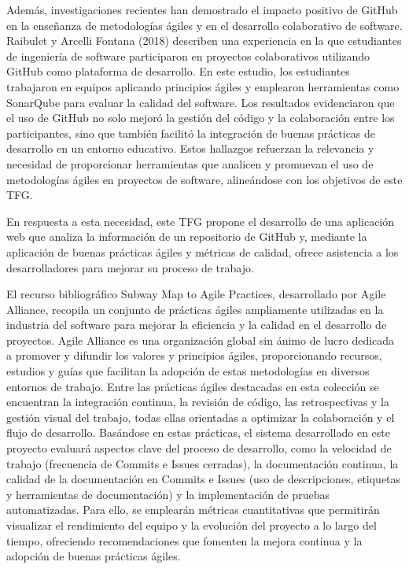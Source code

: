Además, investigaciones recientes han demostrado el impacto positivo de GitHub en la enseñanza de metodologías ágiles y en el desarrollo colaborativo de software. Raibulet y Arcelli Fontana (2018) \cite{raibulet2018409} describen una experiencia en la que estudiantes de ingeniería de software participaron en proyectos colaborativos utilizando GitHub como plataforma de desarrollo. En este estudio, los estudiantes trabajaron en equipos aplicando principios ágiles y emplearon herramientas como SonarQube para evaluar la calidad del software. Los resultados evidenciaron que el uso de GitHub no solo mejoró la gestión del código y la colaboración entre los participantes, sino que también facilitó la integración de buenas prácticas de desarrollo en un entorno educativo. Estos hallazgos refuerzan la relevancia y necesidad de proporcionar herramientas que analicen y promuevan el uso de metodologías ágiles en proyectos de software, alineándose con los objetivos de este TFG.

En respuesta a esta necesidad, este TFG propone el desarrollo de una aplicación web que analiza la información de un repositorio de GitHub y, mediante la aplicación de buenas prácticas ágiles y métricas de calidad, ofrece asistencia a los desarrolladores para mejorar su proceso de trabajo.

El recurso bibliográfico Subway Map to Agile Practices, desarrollado por Agile Alliance, recopila un conjunto de prácticas ágiles ampliamente utilizadas en la industria del software para mejorar la eficiencia y la calidad en el desarrollo de proyectos. Agile Alliance es una organización global sin ánimo de lucro dedicada a promover y difundir los valores y principios ágiles, proporcionando recursos, estudios y guías que facilitan la adopción de estas metodologías en diversos entornos de trabajo. Entre las prácticas ágiles destacadas en esta colección se encuentran la integración continua, la revisión de código, las retrospectivas y la gestión visual del trabajo, todas ellas orientadas a optimizar la colaboración y el flujo de desarrollo. Basándose en estas prácticas, el sistema desarrollado en este proyecto evaluará aspectos clave del proceso de desarrollo, como la velocidad de trabajo (frecuencia de Commits e Issues cerradas), la documentación continua, la calidad de la documentación en Commits e Issues (uso de descripciones, etiquetas y herramientas de documentación) y la implementación de pruebas automatizadas. Para ello, se emplearán métricas cuantitativas que permitirán visualizar el rendimiento del equipo y la evolución del proyecto a lo largo del tiempo, ofreciendo recomendaciones que fomenten la mejora continua y la adopción de buenas prácticas ágiles.

